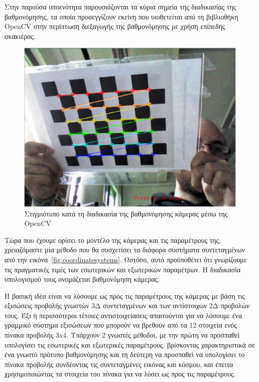 Στην παρούσα υποενότητα παρουσιάζονται τα κύρια σημεία της διαδικασίας της βαθμονόμησης, τα οποία προσεγγίζουν εκείνη που υιοθετείται από τη βιβλιοθήκη OpenCV στην περίπτωση διεξαγωγής της βαθμονόμησης με χρήση επίπεδης σκακιέρας.


\begin{figure}[H]
    \centering
    \includegraphics[scale=0.6, angle=0]{Files/Figures/calibration.png}
    \caption[Στιγμιότυπο κατά τη διαδικασία της βαθμονόμησης κάμερας μέσω της OpenCV]{ Στιγμιότυπο κατά τη διαδικασία της βαθμονόμησης κάμερας μέσω της OpenCV}
    \label{fig:calibration_screenshot}
\end{figure}




Τώρα που έχουμε ορίσει το μοντέλο της κάμερας και τις παραμέτρους της, χρειαζόμαστε μία μέθοδο που θα συσχετίσει τα διάφορα συστήματα συντεταγμένων από την εικόνα~\ref{fig:coordinatesystems}. Ωστόσο, αυτό προϋποθέτει ότι γνωρίζουμε τις πραγματικές τιμές των εσωτερικών και εξωτερικών παραμέτρων. Η διαδικασία υπολογισμού τους ονομάζεται βαθμονόμηση κάμερας.

Η βασική ιδέα είναι να λύσουμε ως προς τις παραμέτρους της κάμερας με βάση τις εξισώσεις προβολής γνωστών 3Δ συντεταγμένων και των αντίστοιχων 2Δ προβολών τους. Έξι ή περισσότεροι τέτοιες αντιστοιχείασεις απαιτούνται για να λύσουμε ένα γραμμικό σύστημα εξισώσεων που μπορούν να βρεθούν από τα 12 στοιχεία ενός πίνακα προβολής 3x4. Υπάρχουν 2 γνωστές μέθοδοι, με την πρώτη να προσπαθεί υπολογίσει τις εσωτερικές και εξωτερικές παραμέτρους, βρίσκοντας χαρακτηριστικά σε ένα γνωστό πρότυπο βαθμονόμησης και τη δεύτερη να προσπαθεί να υπολογίσει το πίνακα προβολής συνδέοντας τις συντεταγμένες εικόνας και κόσμου, και έπειτα χρησιμοποιώντας τα στοιχεία του πίνακα για να λύσει ως προς τις παραμέτρους. 


